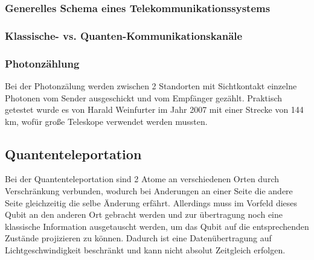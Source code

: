 \subsubsection{Generelles Schema eines Telekommunikationssystems}

\subsubsection{Klassische- vs. Quanten-Kommunikationskanäle}

\subsubsection{Photonzählung}

Bei der Photonzälung werden zwischen 2 Standorten mit Sichtkontakt einzelne Photonen vom Sender ausgeschickt und vom Empfänger gezählt. Praktisch getestet wurde es von Harald Weinfurter im Jahr 2007 mit einer Strecke von 144 km, wofür große Teleskope verwendet werden mussten.

\subsection{Quantenteleportation}
\label{sec:Quantenteleportation}

Bei der Quantenteleportation sind 2 Atome an verschiedenen Orten durch Verschränkung verbunden, wodurch bei Anderungen an einer Seite die andere Seite gleichzeitig die selbe Änderung erfährt. Allerdings muss im Vorfeld dieses Qubit an den anderen Ort gebracht werden und zur übertragung noch eine klassische Information ausgetauscht werden, um das Qubit auf die entsprechenden Zustände projizieren zu können. Dadurch ist eine Datenübertragung auf Lichtgeschwindigkeit beschränkt und kann nicht absolut Zeitgleich erfolgen.




